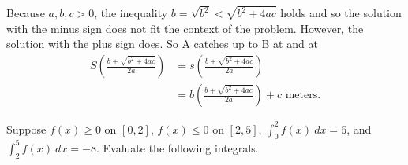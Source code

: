 \documentclass[12pt, addpoints]{exam}
\newcommand{\vstr}{\vspace{\stretch{1}}}
\theoremstyle{plain}
\begin{document}
\begin{questions}
\begin{parts}
\begin{solutionbox}
\vspace{-0.75pc}
Because $a,b,c>0$, the inequality $b=\sqrt{b^2}<\sqrt{b^2+4ac}$ holds and so the solution with the minus sign does not fit the context of the problem.  However, the solution with the plus sign does.  So  A catches up to B at  and at
\vspace{-1pc}
\begin{align*}
S\left(\frac{b+ \sqrt{b^2+4ac}}{2a}\right) &= s\left(\frac{b+ \sqrt{b^2+4ac}}{2a}\right) \\
	&= \boxed{b\left(\frac{b+ \sqrt{b^2+4ac}}{2a}\right)+c \text{ meters.}}
\end{align*}
\end{solutionbox}
\vstr
\end{parts}

\newpage
\question Suppose $f(x)\geq 0$ on $[0,2]$, $f(x)\leq 0$ on $[2,5]$, $\int_0^2f(x)\ dx=6$, and $\int_2^5f(x)\ dx=-8$.  Evaluate the following integrals.

\end{questions}
\end{document}
